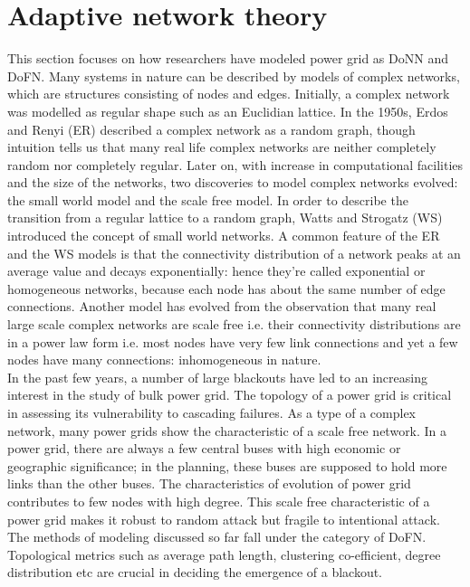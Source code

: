 \documentclass{ifacconf}
\begin{document}
\section{Adaptive network theory}
This section focuses on how researchers have modeled power grid as DoNN and DoFN.   
Many systems in nature can be described by models of complex networks, which are structures consisting of nodes and edges. Initially, a complex network was modelled as regular shape such as an Euclidian lattice.
In the 1950s, Erdos and Renyi (ER) described a complex network as a random graph, though intuition tells us that many real life complex networks are neither completely random nor completely regular.
Later on, with increase in computational facilities and the size of the networks, two discoveries to model complex networks evolved: the small world  model and the scale free model. In order to describe the transition from a regular lattice to a random graph, Watts and Strogatz (WS) introduced the concept of small world networks. A common feature of the ER and the WS models is that the connectivity distribution of a network peaks at an average value and decays exponentially: hence they’re called exponential or homogeneous networks, because each node has about the same number of edge connections. Another model has evolved from the observation that many real large scale complex networks are scale free i.e. their connectivity distributions are in a power law form i.e. most nodes have very few link connections and yet a few nodes have many connections: inhomogeneous in nature. \\
\indent In the past few years, a number of large blackouts have led to an increasing interest in the study of bulk power grid. The topology of a power grid is critical in assessing its vulnerability to cascading failures.
As a type of a complex network, many power grids show the characteristic of a scale free network.
In a power grid, there are always a few central buses with high economic or geographic significance; in the planning, these buses are supposed to hold more links than the other buses.
The characteristics of evolution of power grid contributes to few nodes with high degree.
This scale free characteristic of a power grid makes it robust to random attack but fragile to intentional attack. The   methods of modeling discussed so far fall under the category of DoFN. Topological metrics such as average path length, clustering co-efficient, degree distribution etc are crucial in deciding the emergence of a blackout.\\
\end{document}

